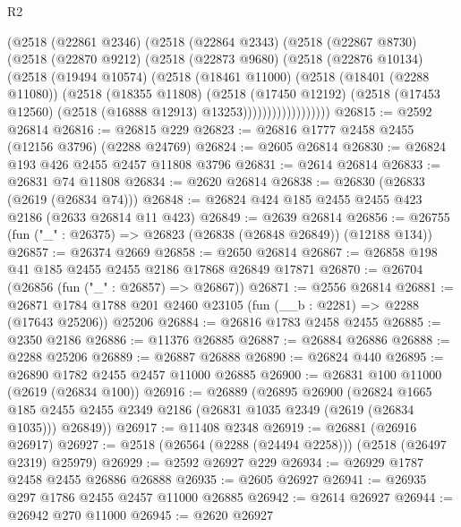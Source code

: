 \begin{lexlean}{R2}
\begin{coremodule}
              (@2518
                (@22861 @2346)
                (@2518
                  (@22864 @2343)
                  (@2518
                    (@22867 @8730)
                    (@2518
                      (@22870 @9212)
                      (@2518
                        (@22873 @9680)
                        (@2518
                          (@22876 @10134)
                          (@2518
                            (@19494 @10574)
                            (@2518
                              (@18461 @11000)
                              (@2518
                                (@18401 (@2288 @11080))
                                (@2518
                                  (@18355 @11808)
                                  (@2518
                                    (@17450 @12192)
                                    (@2518
                                      (@17453 @12560)
                                      (@2518 (@16888 @12913) @13253))))))))))))))))))
@26815 := @2592 @26814
@26816 := @26815 @229
@26823 := @26816 @1777 @2458 @2455 (@12156 @3796) (@2288 @24769)
@26824 := @2605 @26814
@26830 := @26824 @193 @426 @2455 @2457 @11808 @3796
@26831 := @2614 @26814
@26833 := @26831 @74 @11808
@26834 := @2620 @26814
@26838 := @26830 (@26833 (@2619 (@26834 @74)))
@26848 := @26824 @424 @185 @2455 @2455 @423 @2186 (@2633 @26814 @11 @423)
@26849 := @2639 @26814
@26856 := @26755 (fun ("_" : @26375) => @26823 (@26838 (@26848 @26849)) (@12188 @134))
@26857 := @26374 @2669
@26858 := @2650 @26814
@26867 := @26858 @198 @41 @185 @2455 @2455 @2186 @17868 @26849 @17871
@26870 := @26704 (@26856 (fun ("_" : @26857) => @26867))
@26871 := @2556 @26814
@26881 := @26871 @1784 @1788 @201 @2460 @23105 (fun (__b : @2281) => @2288 (@17643 @25206)) @25206
@26884 := @26816 @1783 @2458 @2455
@26885 := @2350 @2186
@26886 := @11376 @26885
@26887 := @26884 @26886
@26888 := @2288 @25206
@26889 := @26887 @26888
@26890 := @26824 @440
@26895 := @26890 @1782 @2455 @2457 @11000 @26885
@26900 := @26831 @100 @11000 (@2619 (@26834 @100))
@26916 := @26889
    (@26895
      @26900
      (@26824
        @1665
        @185
        @2455
        @2455
        @2349
        @2186
        (@26831 @1035 @2349 (@2619 (@26834 @1035)))
        @26849))
@26917 := @11408 @2348
@26919 := @26881 (@26916 @26917)
@26927 := @2518 (@26564 (@2288 (@24494 @2258))) (@2518 (@26497 @2319) @25979)
@26929 := @2592 @26927 @229
@26934 := @26929 @1787 @2458 @2455 @26886 @26888
@26935 := @2605 @26927
@26941 := @26935 @297 @1786 @2455 @2457 @11000 @26885
@26942 := @2614 @26927
@26944 := @26942 @270 @11000
@26945 := @2620 @26927

\end{coremodule}
\end{lexlean}
